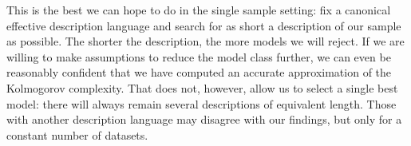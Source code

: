 This is the best we can hope to do in the single sample setting: fix a canonical effective description language and search for as short a description of our sample as possible. The shorter the description, the more models we will reject. If we are willing to make assumptions to reduce the model class further, we can even be reasonably confident that we have computed an accurate approximation of the Kolmogorov complexity. That does not, however, allow us to select a single best model: there will always remain several descriptions of equivalent length. Those with another description language may disagree with our findings, but only for a constant number of datasets.

